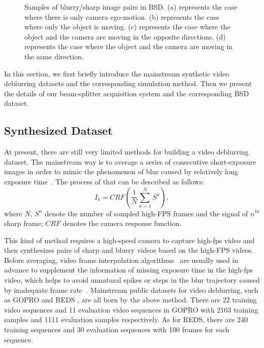\documentclass[twocolumn]{svjour3}          \smartqed  \usepackage{graphicx}
\begin{document}
\begin{figure*}[!ht]
	\centering
{}
	\hfil
	\hfil
	\hfil
	\caption{Samples of blurry/sharp image pairs in BSD. (a) represents the case where there is only camera ego-motion. (b) represents the case where only the object is moving. (c) represents the case where the object and the camera are moving in the opposite directions. (d) represents the case where the object and the camera are moving in the same direction.}
	\label{fig:samples}
\end{figure*}

In this section, we first briefly introduce the mainstream synthetic video deblurring datasets and the corresponding simulation method. Then we present the details of our beam-splitter acquisition system and the corresponding BSD dataset.

\subsection{Synthesized Dataset}

At present, there are still very limited methods for building a video deblurring dataset. The mainstream way is to average a series of consecutive short-exposure images in order to mimic the phenomenon of blur caused by relatively long exposure time~\cite{kim2016dynamic}. The process of that can be described as follows:
\begin{equation}
	I_{b} = CRF\left( \frac{1}{N}\sum_{n=1}^{N}S^{n} \right),
\end{equation}
where $N$, $S^n$ denote the number of sampled high-FPS frames and the signal of $n^{th}$ sharp frame; $CRF$ denotes the camera response function.

This kind of method requires a high-speed camera to capture high-fps video and then synthesizes pairs of sharp and blurry videos based on the high-FPS videos. Before averaging, video frame interpolation algorithms~\cite{niklaus2017video} are usually used in advance to supplement the information of missing exposure time in the high-fps video, which helps to avoid unnatural spikes or steps in the blur trajectory caused by inadequate frame rate~\cite{wieschollek2017learning}. Mainstream public datasets for video deblurring, such as GOPRO \cite{nah2017deep} and REDS \cite{nah2019ntire}, are all born by the above method. There are 22 training video sequences and 11 evaluation video sequences in GOPRO with 2103 training samples and 1111 evaluation samples respectively. As for REDS, there are 240 training sequences and 30 evaluation sequences with 100 frames for each sequence.
\end{document}
